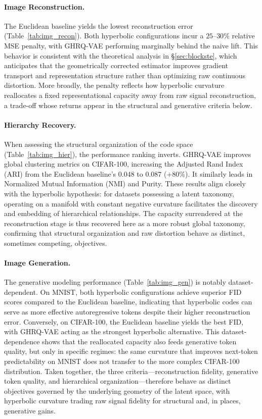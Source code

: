 \documentclass[12pt]{report}
\begin{document}
\paragraph{Image Reconstruction.}
The Euclidean baseline yields the lowest reconstruction error (Table~\ref{tab:img_recon}). Both hyperbolic configurations incur a $25$--$30\%$ relative MSE penalty, with GHRQ-VAE performing marginally behind the naive lift. This behavior is consistent with the theoretical analysis in \S\ref{sec:blockste}, which anticipates that the geometrically corrected estimator improves gradient transport and representation structure rather than optimizing raw continuous distortion. More broadly, the penalty reflects how hyperbolic curvature reallocates a fixed representational capacity away from raw signal reconstruction, a trade-off whose returns appear in the structural and generative criteria below.

\paragraph{Hierarchy Recovery.}
When assessing the structural organization of the code space (Table~\ref{tab:img_hier}), the performance ranking inverts. GHRQ-VAE improves global clustering metrics on CIFAR-100, increasing the Adjusted Rand Index (ARI) from the Euclidean baseline's $0.048$ to $0.087$ ($+80\%$). It similarly leads in Normalized Mutual Information (NMI) and Purity. These results align closely with the hyperbolic hypothesis: for datasets possessing a latent taxonomy, operating on a manifold with constant negative curvature facilitates the discovery and embedding of hierarchical relationships. The capacity surrendered at the reconstruction stage is thus recovered here as a more robust global taxonomy, confirming that structural organization and raw distortion behave as distinct, sometimes competing, objectives.

\paragraph{Image Generation.}
The generative modeling performance (Table~\ref{tab:img_gen}) is notably dataset-dependent. On MNIST, both hyperbolic configurations achieve superior FID scores compared to the Euclidean baseline, indicating that hyperbolic codes can serve as more effective autoregressive tokens despite their higher reconstruction error. Conversely, on CIFAR-100, the Euclidean baseline yields the best FID, with GHRQ-VAE acting as the strongest hyperbolic alternative. This dataset-dependence shows that the reallocated capacity also feeds generative token quality, but only in specific regimes: the same curvature that improves next-token predictability on MNIST does not transfer to the more complex CIFAR-100 distribution. Taken together, the three criteria—reconstruction fidelity, generative token quality, and hierarchical organization—therefore behave as distinct objectives governed by the underlying geometry of the latent space, with hyperbolic curvature trading raw signal fidelity for structural and, in places, generative gains.
\end{document}
